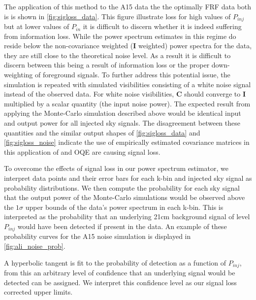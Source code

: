 \documentclass[preprint2,hidelinks]{emulateapj}
\newcommand{\PAPER}{\mathrm{PAPER}}
\begin{document}
{  The application of this method to the A15 data the the optimally FRF data both is is shown in \autoref{fig:sigloss_data}. This figure illustrate loss for high values of $P_{inj}$ but at lower values of $P_{in}$ it is difficult to discern whether it is indeed suffering from information loss. While the power spectrum estimates in this regime do reside below the non-covariance weighted ($\mathbf{I}$ weighted) power spectra for the data, they are still close to the theoretical noise level. As a result it is difficult to discern between this being a result of information loss or the proper down-weighting of foreground signals.
  To further address this potential issue, the simulation is repeated with simulated visibilities consisting of a white noise signal instead of the observed data. For white noise visibilities, $\mathbf{C}$ should converge to $\mathbf{I}$ multiplied by a scalar quantity (the input noise power). The expected result from applying the Monte-Carlo simulation described above would be identical input and output power for all injected sky signals. The disagreement between these quantities and the similar output shapes of \autoref{fig:sigloss_data} and \autoref{fig:sigloss_noise} indicate the use of empirically estimated covariance matrices in this application of and OQE are causing signal loss. 

	To overcome the effects of signal loss in our power spectrum estimator, we interpret data points and their error bars for each k-bin and injected sky signal as probability distributions. We then compute the probability for each sky signal that the output power of the Monte-Carlo simulations would be observed above the $1\sigma$ upper bounds of the data's power spectrum in each k-bin. This is interpreted as the probability that an underlying 21cm background signal of level $P_{inj}$ would have been detected if present in the data. An example of these probability curves for the A15 noise simulation is displayed in \autoref{fig:ali_noise_prob}.
	
	A hyperbolic tangent is fit to the probability of detection as a function of $P_{inj}$, from this an arbitrary level of confidence that an underlying signal would be detected can be assigned. We interpret this confidence level as our signal loss corrected upper limits.
 
 
}
\end{document}
